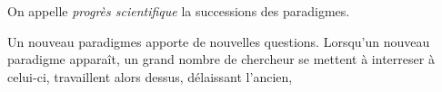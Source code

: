 



On appelle {\it progrès scientifique} la successions des paradigmes.

Un nouveau paradigmes apporte de nouvelles questions. Lorsqu'un nouveau paradigme apparaît, un grand nombre de chercheur se mettent à interreser à celui-ci, travaillent alors dessus, délaissant l'ancien, 


